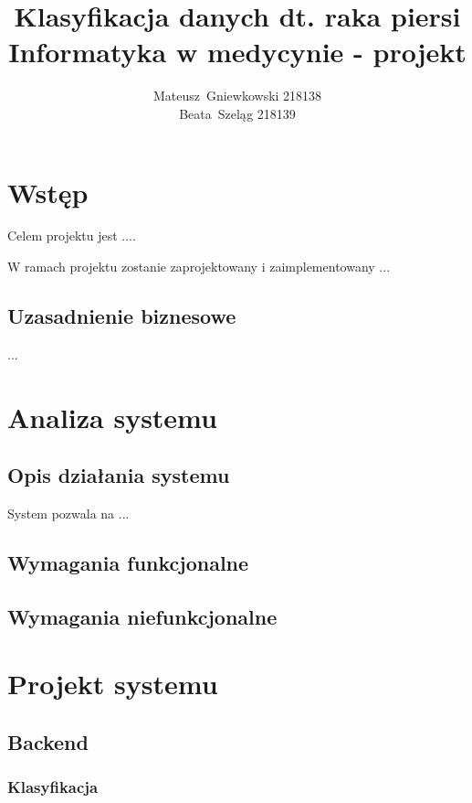 \documentclass[a4paper, 11pt]{report}
\author{Mateusz~Gniewkowski 218138 \\
		Beata~Szeląg 218139}
\title{\huge Klasyfikacja danych dt. raka piersi \\
			 Informatyka w medycynie - projekt}
\date {}
\begin{document}
\maketitle
\tableofcontents{}


 
 
\chapter{Wstęp}


Celem projektu jest ....

W ramach projektu zostanie zaprojektowany i zaimplementowany ...

\section{Uzasadnienie biznesowe}

...

\chapter{Analiza systemu}

	\section{Opis działania systemu}
	
	System pozwala na ...
		
	\section{Wymagania funkcjonalne}
	
	\section{Wymagania niefunkcjonalne}
	
	
\chapter{Projekt systemu}

	\section{Backend}
	
	\subsection{Klasyfikacja}	
	
\end{document}
